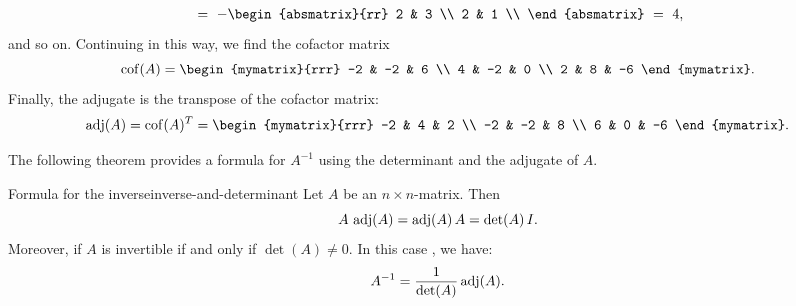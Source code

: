 \begin{solution}
\begin{eqnarray*}
    ~=~ -\begin{absmatrix}{rr}
      2 & 3 \\
      2 & 1 \\
    \end{absmatrix}
    ~=~ 4,
  \end{eqnarray*}
  and so on. Continuing in this way, we find the cofactor matrix
  \begin{equation*}
    \cof(A) 
    =
    \begin{mymatrix}{rrr}
      -2 & -2 & 6 \\
      4 & -2 & 0 \\
      2 & 8 & -6
    \end{mymatrix}.
  \end{equation*}
  Finally, the adjugate is the transpose of the cofactor matrix:
  \begin{equation*}
    \adj(A) = \cof(A)^T = 
    \begin{mymatrix}{rrr}
      -2 & 4 & 2 \\
      -2 & -2 & 8 \\
      6 & 0 & -6
    \end{mymatrix}.
  \end{equation*}  
\end{solution}

The following theorem provides a formula for $A^{-1}$ using the
determinant and the adjugate of $A$.

\begin{theorem}{Formula for the inverse}{inverse-and-determinant}
  Let $A$ be an $n\times n$-matrix. Then
  \begin{equation*}
    A \, \adj(A) = \adj(A)\,A = \det(A)\,I.
  \end{equation*}
  Moreover, if $A$ is invertible if and only if $\det(A) \neq 0$. In this
  case%
  ,
  we have:
  \begin{equation*}
    A^{-1} = \frac{1}{\det(A)} \adj(A).
  \end{equation*}
\end{theorem}

